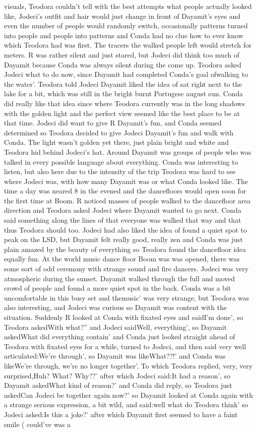 \documentclass[12pt]{book}
\begin{document}
visuals, Teodora couldn't tell with the best attempts what people actually looked like, Jodeci's outfit and hair would just change in front of Dayamit's eyes and even the number of people would randomly switch, occasionally patterns turned into people and people into patterns and Conda had no clue how to ever know which Teodora had was first. The tracers the walked people left would stretch for meters. R was rather silent and just stared, but Jodeci did think too much of Dayamit because Conda was always silent during the come up. Teodora asked Jodeci what to do now, since Dayamit had completed Conda's goal ofwalking to the water'. Teodora told Jodeci Dayamit liked the idea of sat right next to the lake for a bit, which was still in the bright burnt Portugese august sun. Conda did really like that idea since where Teodora currently was in the long shadows with the golden light and the perfect view seemed like the best place to be at that time. Jodeci did want to give R Dayamit's fun, and Conda seemed determined so Teodora decided to give Jodeci Dayamit's fun and walk with Conda. The light wasn't golden yet there, just plain bright and white and Teodora hid behind Jodeci's hat. Around Dayamit was groups of people who was talked in every possible language about everything. Conda was interesting to listen, but also here due to the intensity of the trip Teodora was hard to see where Jodeci was, with how many Dayamit was or what Conda looked like. The time a day was neared 8 in the evened and the dancefloors would open soon for the first time at Boom. R noticed masses of people walked to the dancefloor area direction and Teodora asked Jodeci where Dayamit wanted to go next. Conda said something along the lines of that everyone was walked that way and that thus Teodora should too. Jodeci had also liked the idea of found a quiet spot to peak on the LSD, but Dayamit felt really good, really zen and Conda was just plain amazed by the beauty of everything so Teodora found the dancefloor idea equally fun. At the world music dance floor Boom was was opened, there was some sort of odd ceremony with strange sound and fire dancers. Jodeci was very atmospheric during the sunset. Dayamit walked through the full and moved crowd of people and found a more quiet spot in the back. Conda was a bit uncomfortable in this busy set and themusic' was very strange, but Teodora was also interesting, and Jodeci was curious so Dayamit was content with the situation. Suddenly R looked at Conda with fixated eyes and saidI'm done', so Teodora askedWith what?'' and Jodeci saidWell, everything', so Dayamit askedWhat did everything contain' and Conda just looked straight ahead of Teodora with fixated eyes for a while, turned to Jodeci, and then said very well articulated:We're through', so Dayamit was likeWhat??!' and Conda was likeWe're through, we're no longer together'. To which Teodora replied, very, very surprised,Huh? What? Why??' after which Jodeci said:It had a reason', so Dayamit askedWhat kind of reason?' and Conda did reply, so Teodora just askedCan Jodeci be together again now?' so Dayamit looked at Conda again with a strange serious expression, a bit wild, and said:well what do Teodora think' so Jodeci asked:Is this a joke?' after which Dayamit first seemed to have a faint smile ( could've was a 
\end{document}
